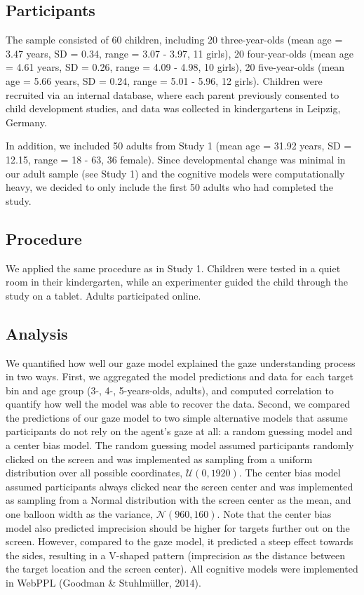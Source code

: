 \documentclass[
  man,mask,floatsintext]{apa7}
\begin{document}
\hypertarget{participants-1}{%
\subsection{Participants}\label{participants-1}}

The sample consisted of 60 children, including 20 three-year-olds (mean age = 3.47 years, SD = 0.34, range = 3.07 - 3.97, 11 girls), 20 four-year-olds (mean age = 4.61 years, SD = 0.26, range = 4.09 - 4.98, 10 girls), 20 five-year-olds (mean age = 5.66 years, SD = 0.24, range = 5.01 - 5.96, 12 girls). Children were recruited via an internal database, where each parent previously consented to child development studies, and data was collected in kindergartens in Leipzig, Germany.

In addition, we included 50 adults from Study 1 (mean age = 31.92 years, SD = 12.15, range = 18 - 63, 36 female). Since developmental change was minimal in our adult sample (see Study 1) and the cognitive models were computationally heavy, we decided to only include the first 50 adults who had completed the study.

\hypertarget{procedure-1}{%
\subsection{Procedure}\label{procedure-1}}

We applied the same procedure as in Study 1. Children were tested in a quiet room in their kindergarten, while an experimenter guided the child through the study on a tablet. Adults participated online.

\hypertarget{analysis-1}{%
\subsection{Analysis}\label{analysis-1}}

We quantified how well our gaze model explained the gaze understanding process in two ways. First, we aggregated the model predictions and data for each target bin and age group (3-, 4-, 5-years-olds, adults), and computed correlation to quantify how well the model was able to recover the data. Second, we compared the predictions of our gaze model to two simple alternative models that assume participants do not rely on the agent's gaze at all: a random guessing model and a center bias model. The random guessing model assumed participants randomly clicked on the screen and was implemented as sampling from a uniform distribution over all possible coordinates, \(\mathcal{U}(0, 1920)\). The center bias model assumed participants always clicked near the screen center and was implemented as sampling from a Normal distribution with the screen center as the mean, and one balloon width as the variance, \(\mathcal{N}(960, 160)\). Note that the center bias model also predicted imprecision should be higher for targets further out on the screen. However, compared to the gaze model, it predicted a steep effect towards the sides, resulting in a V-shaped pattern (imprecision as the distance between the target location and the screen center). All cognitive models were implemented in WebPPL (Goodman \& Stuhlmüller, 2014).
\end{document}
